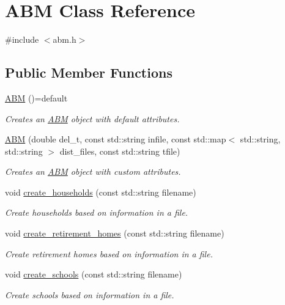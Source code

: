 \hypertarget{classABM}{}\section{A\+BM Class Reference}
\label{classABM}


{\ttfamily \#include $<$abm.\+h$>$}

\subsection*{Public Member Functions}
\begin{DoxyCompactItemize}
\item 
\hyperlink{classABM_aaa90efc4e3d4c52fac43c09b9cf1dd5b}{A\+BM} ()=default
\begin{DoxyCompactList}\small\item\em Creates an \hyperlink{classABM}{A\+BM} object with default attributes. \end{DoxyCompactList}\item 
\hyperlink{classABM_afc21cb6c6320c2d1197293fc176aabdc}{A\+BM} (double del\+\_\+t, const std\+::string infile, const std\+::map$<$ std\+::string, std\+::string $>$ dist\+\_\+files, const std\+::string tfile)
\begin{DoxyCompactList}\small\item\em Creates an \hyperlink{classABM}{A\+BM} object with custom attributes. \end{DoxyCompactList}\item 
void \hyperlink{classABM_ad0aa7567bd46beee2233c4e5a3758fef}{create\+\_\+households} (const std\+::string filename)
\begin{DoxyCompactList}\small\item\em Create households based on information in a file. \end{DoxyCompactList}\item 
void \hyperlink{classABM_afdc04bbe24f059dc3fa22d3d88276db5}{create\+\_\+retirement\+\_\+homes} (const std\+::string filename)
\begin{DoxyCompactList}\small\item\em Create retirement homes based on information in a file. \end{DoxyCompactList}\item 
void \hyperlink{classABM_af980cd2052f2fb883d5873da8c004070}{create\+\_\+schools} (const std\+::string filename)
\begin{DoxyCompactList}\small\item\em Create schools based on information in a file. \end{DoxyCompactList}\item 

\end{DoxyCompactItemize}
